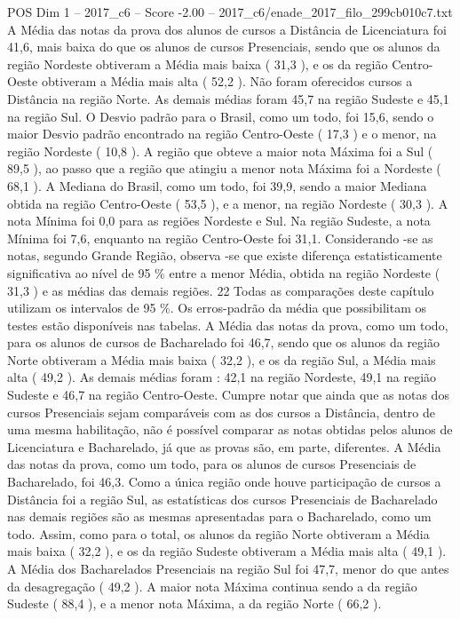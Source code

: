 \begin{textsample}{POS Dim 1 – 2017\_c6 – Score -2.00 – 2017\_c6/enade\_2017\_filo\_299cb010c7.txt}
A Média das notas da prova dos alunos de cursos a Distância de Licenciatura foi 41,6, mais baixa do que os alunos de cursos Presenciais, sendo que os alunos da região Nordeste obtiveram a Média mais baixa ( 31,3 ), e os da região Centro-Oeste obtiveram a Média mais alta ( 52,2 ).
Não foram oferecidos cursos a Distância na região Norte.
As demais médias foram 45,7 na região Sudeste e 45,1 na região Sul.
O Desvio padrão para o Brasil, como um todo, foi 15,6, sendo o maior Desvio padrão encontrado na região Centro-Oeste ( 17,3 ) e o menor, na região Nordeste ( 10,8 ).
A região que obteve a maior nota Máxima foi a Sul ( 89,5 ), ao passo que a região que atingiu a menor nota Máxima foi a Nordeste ( 68,1 ).
A Mediana do Brasil, como um todo, foi 39,9, sendo a maior Mediana obtida na região Centro-Oeste ( 53,5 ), e a menor, na região Nordeste ( 30,3 ).
A nota Mínima foi 0,0 para as regiões Nordeste e Sul.
Na região Sudeste, a nota Mínima foi 7,6, enquanto na região Centro-Oeste foi 31,1.
Considerando -se as notas, segundo Grande Região, observa -se que existe diferença estatisticamente significativa ao nível de 95 \% entre a menor Média, obtida na região Nordeste ( 31,3 ) e as médias das demais regiões. 22 Todas as comparações deste capítulo utilizam os intervalos de 95 \%.
Os erros-padrão da média que possibilitam os testes estão disponíveis nas tabelas.
A Média das notas da prova, como um todo, para os alunos de cursos de Bacharelado foi 46,7, sendo que os alunos da região Norte obtiveram a Média mais baixa ( 32,2 ), e os da região Sul, a Média mais alta ( 49,2 ).
As demais médias foram : 42,1 na região Nordeste, 49,1 na região Sudeste e 46,7 na região Centro-Oeste.
Cumpre notar que ainda que as notas dos cursos Presenciais sejam comparáveis com as dos cursos a Distância, dentro de uma mesma habilitação, não é possível comparar as notas obtidas pelos alunos de Licenciatura e Bacharelado, já que as provas são, em parte, diferentes.
A Média das notas da prova, como um todo, para os alunos de cursos Presenciais de Bacharelado, foi 46,3.
Como a única região onde houve participação de cursos a Distância foi a região Sul, as estatísticas dos cursos Presenciais de Bacharelado nas demais regiões são as mesmas apresentadas para o Bacharelado, como um todo.
Assim, como para o total, os alunos da região Norte obtiveram a Média mais baixa ( 32,2 ), e os da região Sudeste obtiveram a Média mais alta ( 49,1 ).
A Média dos Bacharelados Presenciais na região Sul foi 47,7, menor do que antes da desagregação ( 49,2 ).
A maior nota Máxima continua sendo a da região Sudeste ( 88,4 ), e a menor nota Máxima, a da região Norte ( 66,2 ).

\end{textsample}
